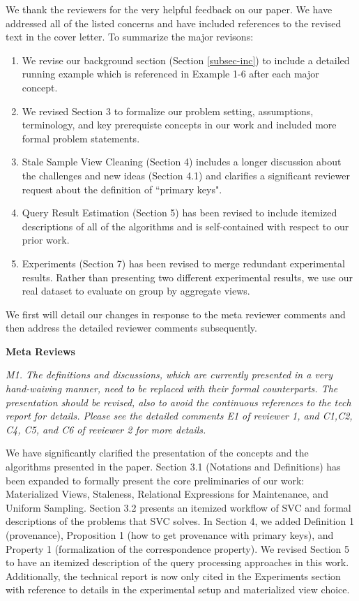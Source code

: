 We thank the reviewers for the very helpful feedback on our paper. We have addressed all of the listed concerns and have included references to the revised text in the cover letter. 
To summarize the major revisons:
\begin{enumerate}
\item We revise our background section (Section \ref{subsec-inc}) to include a detailed running example which is referenced in Example 1-6 after each major concept.
\item We revised Section 3 to formalize our problem setting, assumptions, terminology, and key prerequiste concepts in our work and included more formal problem statements.
\item Stale Sample View Cleaning (Section 4) includes a longer discussion about the challenges and new ideas (Section 4.1) and clarifies a significant reviewer request about the definition of ``primary keys".
\item Query Result Estimation (Section 5) has been revised to include itemized descriptions of all of the algorithms and is self-contained with respect to our prior work.
\item Experiments (Section 7) has been revised to merge redundant experimental results. Rather than presenting two different experimental results, we use our real dataset to evaluate \svc on group by aggregate views.
\end{enumerate}
We first will detail our changes in response to the meta reviewer comments and then address the detailed reviewer comments subsequently.

\vspace{1em}
\noindent\textbf{Meta Reviews}

\emph{M1. The definitions and discussions, which are currently presented in a very hand-waiving manner, need to be replaced with their formal counterparts. The presentation should be revised, also to avoid the continuous references to the tech report for details. Please see the detailed comments E1 of reviewer 1, and C1,C2, C4, C5, and C6 of reviewer 2 for more details.}

We have significantly clarified the presentation of the concepts and the algorithms presented in the paper. Section 3.1 (Notations and Definitions) has been expanded to formally present the core preliminaries of our work: Materialized Views, Staleness, Relational Expressions for Maintenance, and Uniform Sampling. Section 3.2 presents an itemized workflow of SVC and formal descriptions of the problems that SVC solves. In Section 4, we added Definition 1 (provenance), Proposition 1 (how to get provenance with primary keys), and Property 1 (formalization of the correspondence property). We revised Section 5 to have an itemized description of the query processing approaches in this work.  Additionally, the technical report is now only cited in the Experiments section with reference to details in the experimental setup and materialized view choice.

